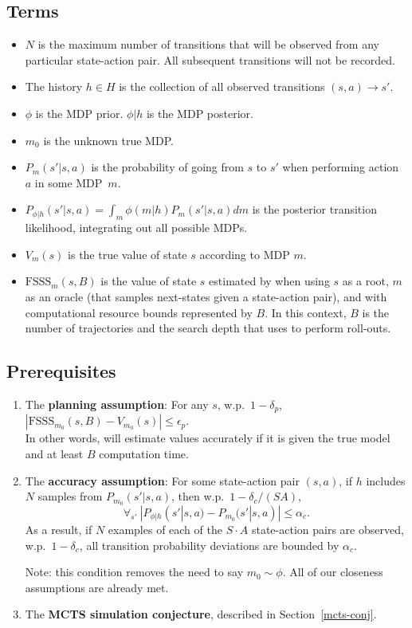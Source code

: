 \subsection{Terms}
\begin{itemize}
\item $N$ is the maximum number of transitions that will be observed from any particular state-action pair. All subsequent transitions will not be recorded.
\item The history $h\in H$ is the collection of all observed transitions $(s,a)\rightarrow s'$.
\item $\phi$ is the MDP prior. $\phi|h$ is the MDP posterior.
\item $m_0$ is the unknown true MDP.
\item $P_m(s'|s,a)$ is the probability of going from $s$ to $s'$ when performing action $a$ in some MDP~$m$.
\item $P_{\phi|h}(s'|s,a)=\int_m \phi(m|h)P_m(s'|s,a) dm$ is the posterior transition likelihood, integrating out all possible MDPs.
\item $V_m(s)$ is the true value of state $s$ according to MDP $m$.
\item $\mbox{FSSS}_m(s, B)$ is the value of state $s$ estimated by  when using $s$ as a root, $m$ as an oracle (that samples next-states given a state-action pair), and with computational resource bounds represented by $B$. In this context, $B$ is the number of trajectories and the search depth that  uses to perform roll-outs.
\end{itemize}

\subsection{Prerequisites}
\begin{enumerate}
\item \label{fsss-acc} The {\bf planning assumption}: For any $s$, w.p.\ $1-\delta_p$, $|\mbox{FSSS}_{m_0}(s, B)-V_{m_0}(s)| \leq \epsilon_p$.\\
In other words,  will estimate values accurately if it is given the true model and at least $B$ computation time. 
\item \label{sa-bound} The {\bf accuracy assumption}: For some state-action pair $(s,a)$, if $h$ includes $N$ samples from $P_{m_0}(s'|s,a)$, then w.p.\ $1-\delta_c/(S A)$,
$$\forall_{s'}~|P_{\phi|h}(s'|s,a) - P_{m_0}(s'|s,a)| \leq \alpha_c.$$
As a result, if $N$ examples of each of the $S\cdot A$ state-action pairs are observed, w.p.\ $1-\delta_c$, all transition probability deviations are bounded by $\alpha_c$.

Note: this condition removes the need to say $m_0 \sim \phi$. All of our closeness assumptions are already met.
\item The {\bf MCTS simulation conjecture}, described in Section~\ref{mcts-conj}.
\end{enumerate}



